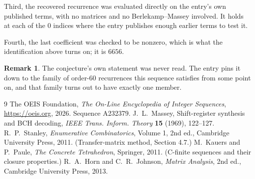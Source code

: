 \documentclass[11pt,a4paper]{article}
\theoremstyle{plain}
\theoremstyle{definition}
\newtheorem{remark}[theorem]{Remark}
\begin{document}
Third, the recovered recurrence was evaluated directly on the entry's own published terms, with
no matrices and no Berlekamp--Massey involved. It holds at each of the $0$ indices where
the entry publishes enough earlier terms to test it.

Fourth, the last coefficient was checked to be nonzero, which is what the identification above
turns on; it is $6656$.

\begin{remark}
The conjecture's own statement was never read. The entry pins it down to the family of
order-$60$ recurrences this sequence satisfies from some point on, and that family turns
out to have exactly one member.
\end{remark}

\begin{thebibliography}{9}
 The OEIS Foundation, \emph{The On-Line Encyclopedia of Integer
Sequences}, \url{https://oeis.org}, 2026. Sequence A232379.
 J.~L.~Massey, Shift-register synthesis and BCH decoding, \emph{IEEE
Trans. Inform. Theory} \textbf{15} (1969), 122--127.
 R.~P.~Stanley, \emph{Enumerative Combinatorics}, Volume 1, 2nd ed.,
Cambridge University Press, 2011. (Transfer-matrix method, Section 4.7.)
 M.~Kauers and P.~Paule, \emph{The Concrete Tetrahedron}, Springer, 2011.
(C-finite sequences and their closure properties.)
 R.~A.~Horn and C.~R.~Johnson, \emph{Matrix Analysis}, 2nd ed., Cambridge
University Press, 2013.
\end{thebibliography}
\end{document}
